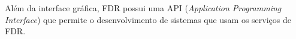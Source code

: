 
Além da interface gráfica, FDR possui uma API (\textit{Application Programming Interface}) que permite o desenvolvimento de sistemas que usam os serviços de FDR. 





